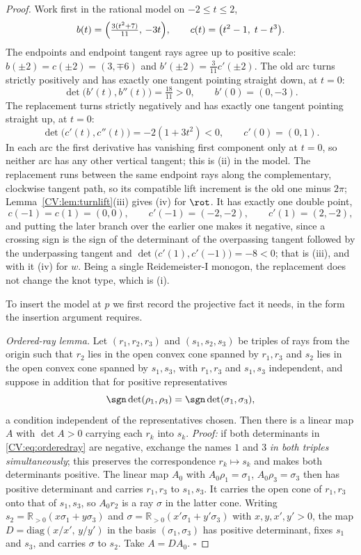 \begin{proof}\leanok{}
Work first in the rational model on $-2\leq t\leq2$,
\[
b(t)=\Bigl(\tfrac{3(t^2+7)}{11},\,-3t\Bigr),\qquad
c(t)=\bigl(t^2-1,\;t-t^3\bigr).
\]
The endpoints and endpoint tangent rays agree up to positive scale:
$b(\pm2)=c(\pm2)=(3,\mp6)$ and $b'(\pm2)=\frac3{11}c'(\pm2)$. The old arc turns
strictly positively and has exactly one tangent pointing straight down, at
$t=0$:
\[
\det\bigl(b'(t),b''(t)\bigr)=\tfrac{18}{11}>0,\qquad b'(0)=(0,-3).
\]
The replacement turns strictly negatively and has exactly one tangent pointing
straight up, at $t=0$:
\[
\det\bigl(c'(t),c''(t)\bigr)=-2(1+3t^2)<0,\qquad c'(0)=(0,1).
\]
In each arc the first derivative has vanishing first component only at $t=0$, so
neither arc has any other vertical tangent; this is (ii) in the model. The
replacement runs between the same endpoint rays along the complementary,
clockwise tangent path, so its compatible lift increment is the old one minus
$2\pi$; Lemma~\ref{CV:lem:turnlift}(iii) gives (iv) for $\rot$. It has exactly one double point,
\[
c(-1)=c(1)=(0,0),\qquad c'(-1)=(-2,-2),\qquad c'(1)=(2,-2),
\]
and putting the later branch over the earlier one makes it negative, since a
crossing sign is the sign of the determinant of the overpassing tangent followed
by the underpassing tangent and
$\det\bigl(c'(1),c'(-1)\bigr)=-8<0$; that is (iii), and with it (iv) for $w$.
Being a single Reidemeister-I monogon, the replacement does not change the knot
type, which is (i).

To insert the model at $p$ we first record the projective fact it needs, in the
form the insertion argument requires.

\emph{Ordered-ray lemma.} Let $(r_1,r_2,r_3)$ and $(s_1,s_2,s_3)$ be triples of
rays from the origin such that $r_2$ lies in the open convex cone spanned by
$r_1,r_3$ and $s_2$ lies in the open convex cone spanned by $s_1,s_3$, with
$r_1,r_3$ and $s_1,s_3$ independent, and suppose in addition that for positive
representatives
\begin{equation}
   \sgn\det(\rho_1,\rho_3)=\sgn\det(\sigma_1,\sigma_3),
\label{CV:eq:orderedray}
\end{equation}
a condition independent of the representatives chosen. Then there is a linear
map $A$ with $\det A>0$ carrying each $r_k$ into $s_k$.
\emph{Proof:} if both determinants in \eqref{CV:eq:orderedray} are negative,
exchange the names $1$ and $3$ \emph{in both triples simultaneously}; this
preserves the correspondence $r_k\mapsto s_k$ and makes both determinants
positive. The linear map $A_0$ with $A_0\rho_1=\sigma_1$, $A_0\rho_3=\sigma_3$
then has positive determinant and carries $r_1,r_3$ to $s_1,s_3$. It carries the
open cone of $r_1,r_3$ onto that of $s_1,s_3$, so $A_0r_2$ is a ray $\sigma$ in
the latter cone. Writing $s_2=\mathbb R_{>0}(x\sigma_1+y\sigma_3)$ and
$\sigma=\mathbb R_{>0}(x'\sigma_1+y'\sigma_3)$ with $x,y,x',y'>0$, the map
$D=\mathrm{diag}(x/x',\,y/y')$ in the basis $(\sigma_1,\sigma_3)$ has positive
determinant, fixes $s_1$ and $s_3$, and carries $\sigma$ to $s_2$. Take
$A=DA_0$. $\square$


\end{proof}
